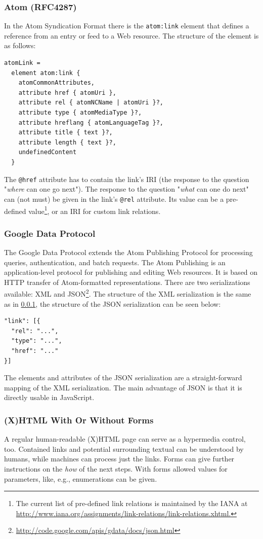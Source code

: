\documentclass{acm_proc_article-sp}
\begin{document}
\subsubsection{Atom (RFC4287)}\label{sec:atom}
In the Atom Syndication Format \cite{Atom:Synd} there is the \texttt{atom:link} element that defines a reference from an entry or feed to a Web resource. The structure of the element is as follows:
\begin{verbatim}
atomLink =
  element atom:link {
    atomCommonAttributes,
    attribute href { atomUri },
    attribute rel { atomNCName | atomUri }?,
    attribute type { atomMediaType }?,
    attribute hreflang { atomLanguageTag }?,
    attribute title { text }?,
    attribute length { text }?,
    undefinedContent
  }
\end{verbatim}
The \texttt{@href} attribute has to contain the link's IRI (the response to the question "\textit{where} can one go next"). The response to the question "\textit{what} can one do next" can (not must) be given in the link's \texttt{@rel} attribute. Its value can be a pre-defined value\footnote{The current list of pre-defined link relations is maintained by the IANA at \url{http://www.iana.org/assignments/link-relations/link-relations.xhtml.}}, or an IRI for custom link relations.

\subsubsection{Google Data Protocol}\label{sec:gdata}
The Google Data Protocol\cite{Google:Data} extends the Atom Publishing Protocol\cite{Atom:Pub} for processing queries, authentication, and batch requests. The Atom Publishing is an application-level protocol for publishing and editing Web resources. It is based on HTTP transfer of Atom-formatted representations. There are two serializations available: XML and JSON\footnote{\url{http://code.google.com/apis/gdata/docs/json.html}}. The structure of the XML serialization is the same as in \ref{sec:atom}, the structure of the JSON serialization can be seen below:
\begin{verbatim}
"link": [{
  "rel": "...",
  "type": "...",
  "href": "..."
}]
\end{verbatim}
The elements and attributes of the JSON serialization are a straight-forward mapping of the XML serialization. The main advantage of JSON is that it is directly usable in JavaScript.

\subsubsection{(X)HTML With Or Without Forms}\label{sec:xhtml}
A regular human-readable (X)HTML page can serve as a hypermedia control, too. Contained links and potential surrounding textual can be understood by humans, while machines can process just the links. Forms can give further instructions on the \textit{how} of the next steps. With forms allowed values for parameters, like, e.g., enumerations can be given.
\end{document}
